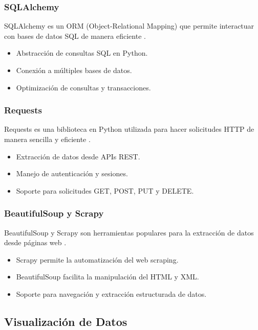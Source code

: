 \subsubsection{SQLAlchemy}
SQLAlchemy es un ORM (Object-Relational Mapping) que permite interactuar con bases de datos SQL de manera eficiente \cite{bayer2010sqlalchemy}.

\begin{itemize}
	\item Abstracción de consultas SQL en Python.
	\item Conexión a múltiples bases de datos.
	\item Optimización de consultas y transacciones.
\end{itemize}

\subsubsection{Requests}
Requests es una biblioteca en Python utilizada para hacer solicitudes HTTP de manera sencilla y eficiente \cite{reitz2011requests}.

\begin{itemize}
	\item Extracción de datos desde APIs REST.
	\item Manejo de autenticación y sesiones.
	\item Soporte para solicitudes GET, POST, PUT y DELETE.
\end{itemize}

\subsubsection{BeautifulSoup y Scrapy}
BeautifulSoup y Scrapy son herramientas populares para la extracción de datos desde páginas web \cite{richardson2007beautifulsoup}.

\begin{itemize}
	\item Scrapy permite la automatización del web scraping.
	\item BeautifulSoup facilita la manipulación del HTML y XML.
	\item Soporte para navegación y extracción estructurada de datos.
\end{itemize}

\subsection{Visualización de Datos}

